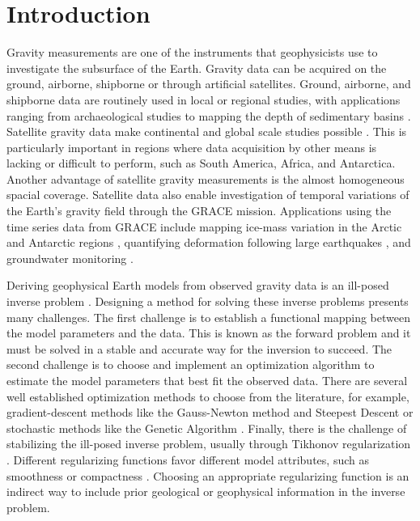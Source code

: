 \chapter{Introduction}


Gravity measurements are one of the instruments that geophysicists use to
investigate the subsurface of the Earth.
Gravity data can be acquired on the ground, airborne, shipborne or through
artificial satellites.
Ground, airborne, and shipborne data are routinely used in local or regional
studies, with applications ranging from archaeological studies
\citep[e.g., ][]{panisova2013} to mapping the depth of
sedimentary basins \citep[e.g., ][]{gordon2013}.
Satellite gravity data make continental and global scale studies possible
\citep[e.g., ][]{vandermeijde2013, vandermeijde2015, bouman2013,
braitenberg2015, reguzzoni2013}.
This is particularly important in regions where data acquisition by other means
is lacking or difficult to perform, such as South America, Africa, and
Antarctica.
Another advantage of satellite gravity measurements is the almost homogeneous
spacial coverage.
Satellite data also enable investigation of temporal variations of the Earth's
gravity field through the GRACE mission.
Applications using the time series data from GRACE include mapping ice-mass
variation in the Arctic \citep{chen2011} and Antarctic regions
\citep{ramillien2006}, quantifying deformation following large earthquakes
\citep{mikhailov2014}, and groundwater monitoring \citep{humphrey2016}.

Deriving geophysical Earth models from observed gravity data is an ill-posed
inverse problem \citep{backus1967, backus1968}.
Designing a method for solving these inverse problems presents many challenges.
The first challenge is to establish a functional mapping between the model
parameters and the data.
This is known as the forward problem and it must be solved in a stable and
accurate way for the inversion to succeed.
The second challenge is to choose and implement an optimization algorithm to
estimate the model parameters that best fit the observed data.
There are several well established optimization methods to choose from the
literature, for example, gradient-descent methods like the Gauss-Newton method
and Steepest Descent or stochastic  methods like the Genetic Algorithm
\citep[e.g., ][]{menke1984, kelley1987, aster2012}.
Finally, there is the challenge of stabilizing the ill-posed inverse problem,
usually through Tikhonov regularization \citep{tikhonov1977}.
Different regularizing functions favor different model attributes, such as
smoothness or compactness \citep[e.g., ][]{silva2001b}.
Choosing an appropriate regularizing function is an indirect way to include
prior geological or geophysical information in the inverse problem.

